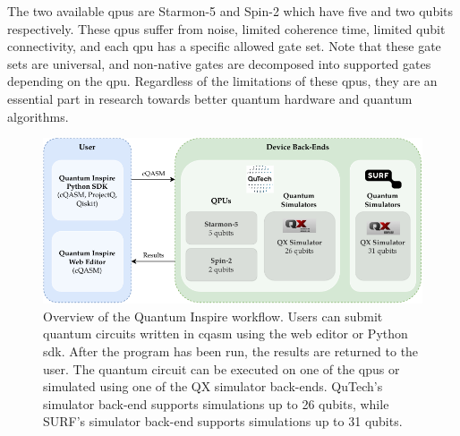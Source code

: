 The two available \glspl{qpu} are Starmon-5 and Spin-2 which have five and two qubits respectively.
These \glspl{qpu} suffer from noise, limited coherence time, limited qubit connectivity, and each \gls{qpu} has a specific allowed gate set.
Note that these gate sets are universal, and non-native gates are decomposed into supported gates depending on the \gls{qpu}.
Regardless of the limitations of these \glspl{qpu}, they are an essential part in research towards better quantum hardware and quantum algorithms.
\begin{figure}[ht]
    \centering
    \includegraphics[width=1\linewidth]{figures/qi-workflow.pdf}
    \caption[Overview of the Quantum Inspire workflow.]{
        Overview of the Quantum Inspire workflow.
        Users can submit quantum circuits written in \gls{cqasm} using the web editor or Python \gls{sdk}.
        After the program has been run, the results are returned to the user.
        The quantum circuit can be executed on one of the \glspl{qpu} or simulated using one of the QX simulator back-ends.
        QuTech's simulator back-end supports simulations up to 26 qubits, while SURF's simulator back-end supports simulations up to 31 qubits.
    }
    \label{fig:qi-workflow}
\end{figure}

